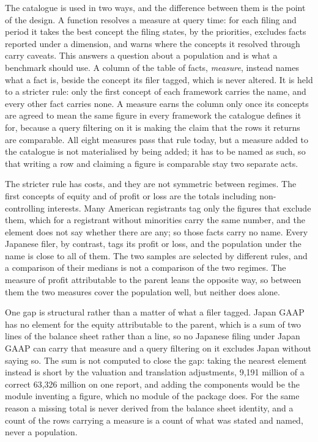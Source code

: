 The catalogue is used in two ways, and the difference between them is the point of the design. A function resolves a measure at query time: for each filing and period it takes the best concept the filing states, by the priorities, excludes facts reported under a dimension, and warns where the concepts it resolved through carry caveats. This answers a question about a population and is what a benchmark should use. A column of the table of facts, \emph{measure}, instead names what a fact is, beside the concept its filer tagged, which is never altered. It is held to a stricter rule: only the first concept of each framework carries the name, and every other fact carries none. A measure earns the column only once its concepts are agreed to mean the same figure in every framework the catalogue defines it for, because a query filtering on it is making the claim that the rows it returns are comparable. All eight measures pass that rule today, but a measure added to the catalogue is not materialised by being added; it has to be named as such, so that writing a row and claiming a figure is comparable stay two separate acts.

The stricter rule has costs, and they are not symmetric between regimes. The first concepts of equity and of profit or loss are the totals including non-controlling interests. Many American registrants tag only the figures that exclude them, which for a registrant without minorities carry the same number, and the element does not say whether there are any; so those facts carry no name. Every Japanese filer, by contrast, tags its profit or loss, and the population under the name is close to all of them. The two samples are selected by different rules, and a comparison of their medians is not a comparison of the two regimes. The measure of profit attributable to the parent leans the opposite way, so between them the two measures cover the population well, but neither does alone.

One gap is structural rather than a matter of what a filer tagged. Japan GAAP has no element for the equity attributable to the parent, which is a sum of two lines of the balance sheet rather than a line, so no Japanese filing under Japan GAAP can carry that measure and a query filtering on it excludes Japan without saying so. The sum is not computed to close the gap: taking the nearest element instead is short by the valuation and translation adjustments, 9,191 million of a correct 63,326 million on one report, and adding the components would be the module inventing a figure, which no module of the package does. For the same reason a missing total is never derived from the balance sheet identity, and a count of the rows carrying a measure is a count of what was stated and named, never a population.

